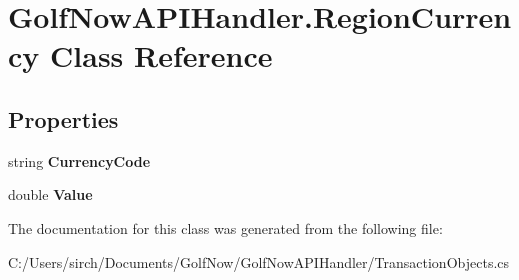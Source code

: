 \hypertarget{class_golf_now_a_p_i_handler_1_1_region_currency}{}\section{Golf\+Now\+A\+P\+I\+Handler.\+Region\+Currency Class Reference}
\label{class_golf_now_a_p_i_handler_1_1_region_currency}
\subsection*{Properties}
\begin{DoxyCompactItemize}
\item 
\mbox{\label{class_golf_now_a_p_i_handler_1_1_region_currency_a9576e6e3d1824b99f903c853bdb145d4}} 
string {\bfseries Currency\+Code}
\item 
\mbox{\label{class_golf_now_a_p_i_handler_1_1_region_currency_a155cf60b45b75776b269105607030bd0}} 
double {\bfseries Value}
\end{DoxyCompactItemize}


The documentation for this class was generated from the following file\+:\begin{DoxyCompactItemize}
\item 
C\+:/\+Users/sirch/\+Documents/\+Golf\+Now/\+Golf\+Now\+A\+P\+I\+Handler/Transaction\+Objects.\+cs\end{DoxyCompactItemize}
